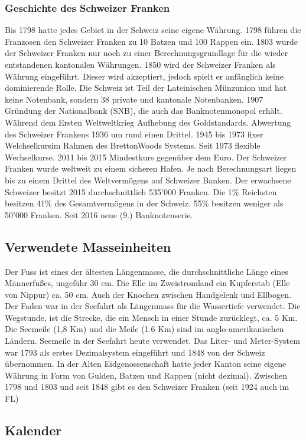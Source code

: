 \documentclass[10pt, openright=true]{scrartcl}
\begin{document}
\subsubsection{Geschichte des Schweizer Franken}
Bis 1798 hatte jedes Gebiet in der Schweiz seine eigene Währung. 1798 führen die Franzosen den Schweizer Franken zu 10 Batzen und 100 Rappen ein. 1803 wurde der Schweizer Franken nur noch zu einer Berechnungsgrundlage für die wieder entstandenen kantonalen Währungen. 1850 wird der Schweizer Franken als Währung eingeführt. Dieser wird akzeptiert, jedoch spielt er anfänglich keine dominierende Rolle. Die Schweiz ist Teil der Lateinischen Münzunion und hat keine Notenbank, sondern 38 private und kantonale Notenbanken. 1907 Gründung der Nationalbank (SNB), die auch das Banknotenmonopol erhält. Während dem Ersten Weltweltkrieg Aufhebung des Goldstandards. Abwertung des Schweizer Frankens 1936 um rund einen Drittel. 1945 bis 1973 fixer Welchselkursim Rahmen des BrettonWoods Systems. Seit 1973 flexible Wechselkurse. 2011 bis 2015 Mindestkurs gegenüber dem Euro. Der Schweizer Franken wurde weltweit zu einem sicheren Hafen. Je nach Berechnungsart liegen bis zu einem Drittel des Weltvermögens auf Schweizer Banken. Der erwachsene Schweizer besitzt 2015 durchschnittlich 535’000 Franken. Die 1\% Reichsten besitzen 41\% des Gesamtvermögens in der Schweiz. 55\% besitzen weniger als 50’000 Franken. Seit 2016 neue (9.) Banknotenserie.
\subsection{Verwendete Masseinheiten}
Der Fuss ist eines der ältesten Längenmasse, die durchschnittliche Länge eines Männerfußes, ungefähr 30 cm. Die Elle im Zweistromland ein Kupferstab (\glqq Elle von Nippur\grqq) ca. 50 cm. Auch der Knochen zwischen Handgelenk und Ellbogen. Der Faden war in der Seefahrt als Längenmass für die Wassertiefe verwendet. Die Wegstunde, ist die Strecke, die ein Mensch in einer Stunde zurücklegt, ca. 5 Km. Die Seemeile (1,8 Km) und die Meile (1.6 Km) sind im anglo-amerikanischen Ländern. Seemeile in der
Seefahrt heute verwendet. Das Liter- und Meter-System war 1793 als erstes Dezimalsystem eingeführt und 1848 von der Schweiz übernommen. In der Alten Eidgenossenschaft hatte jeder Kanton seine eigene Währung in Form von Gulden, Batzen und Rappen (nicht dezimal). Zwischen 1798 und 1803 und seit 1848 gibt es den Schweizer Franken (seit 1924 auch im FL)
\subsection{Kalender}
\end{document}
